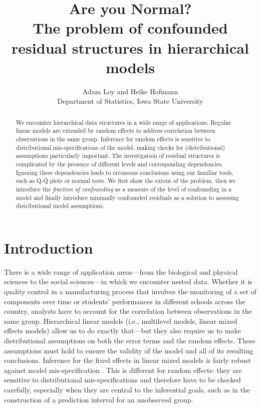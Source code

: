 \documentclass{article} %
\title{Are you Normal? \\ {\Large The problem of confounded residual structures in hierarchical models}}
\author{
	Adam Loy and Heike Hofmann\\
	Department of Statistics,
	Iowa State University
}
\newcommand{\hh}[1]{{\color{orange} #1}}
\newcommand{\al}[1]{{\color{red} #1}}
\begin{document}
\maketitle


\begin{abstract}
We encounter hierarchical data structures in a wide range of applications. Regular linear models are extended by random effects to address correlation between observations in the same group. Inference for random effects is sensitive to  distributional mis-specifications of the model, making checks for (distributional) assumptions particularly important.  The investigation of residual structures is complicated by the presence of  different levels and corresponding  dependencies. Ignoring these dependencies leads to  erroneous conclusions using our familiar tools, such as Q-Q plots or normal tests. We first show the extent of the problem, then we introduce the {\it fraction of confounding} as a measure of the level of confounding in a model and finally introduce minimally confounded residuals as a solution to assessing distributional model assumptions.
\end{abstract}


\section{Introduction}\label{sec:intro}
There is a wide range of application areas---from the biological and physical sciences to the social sciences---in which we encounter nested  data.
Whether it is quality control in a manufacturing process that involves the monitoring of a set of components over  time  or students' performances in different schools across the country, analysts have to account for  the correlation between observations in the same group.  Hierarchical linear models \al{(i.e., multilevel models, linear mixed effects models)} allow us to do exactly that---but they also require us to make distributional assumptions on both the error terms and the random effects. These assumptions must hold to ensure the validity of the model \hh{and all of its resulting conclusions.} 
Inference for the fixed effects in linear mixed models is fairly robust against model mis-specification \citep{Butler:1992tx, Verbeke:1997tf}. This is different for random effects: they are sensitive to  distributional mis-specifications and  therefore have to be checked carefully, especially when they are central to the inferential goals, such as in the construction of a prediction interval for an unobserved group.
\end{document}
